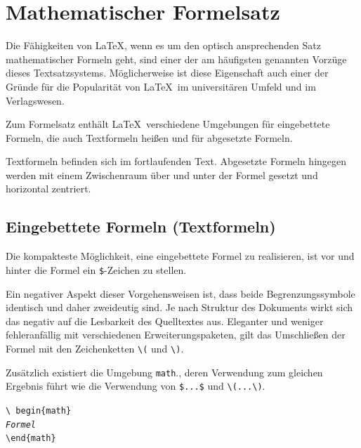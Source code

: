 \documentclass[a4paper,10pt,twoside]{scrbook}
\begin{document}
\chapter{Mathematischer Formelsatz}
\label{KapitelMathematik}

Die Fähigkeiten von \LaTeX, wenn es um den optisch ansprechenden Satz mathematischer Formeln geht, sind einer der am häufigsten genannten Vorzüge dieses Textsatzsystems. Möglicherweise ist diese Eigenschaft auch einer der Gründe für die Popularität von \LaTeX\ 
im universitären Umfeld und im Verlagswesen.


Zum Formelsatz enthält \LaTeX\ verschiedene Umgebungen für eingebettete Formeln, die auch Textformeln heißen
und für abgesetzte Formeln.

Textformeln befinden sich im fortlaufenden Text. Abgesetzte Formeln hingegen werden
mit einem Zwischenraum über und unter der Formel gesetzt und horizontal zentriert.

\section{Eingebettete Formeln (Textformeln)}

Die kompakteste Möglichkeit, eine eingebettete Formel zu realisieren, ist vor und hinter die 
Formel ein \verb!$!-Zeichen zu stellen. 


Ein negativer Aspekt dieser Vorgehensweisen ist, dass
beide Begrenzungssymbole identisch und daher zweideutig sind. 
Je nach Struktur des Dokuments wirkt sich das negativ auf die Lesbarkeit des Quelltextes aus.
Eleganter und weniger fehleranfällig mit verschiedenen Erweiterungspaketen, gilt das 
Umschließen der Formel mit den Zeichenketten \verb!\(! und \verb!\)!.



Zusätzlich existiert die Umgebung \verb!math!., deren Verwendung zum
gleichen Ergebnis führt wie die
Verwendung von \verb!$...$! und \verb!\(...\)!.

\begin{boxedminipage}{\textwidth}
\texttt{\textbackslash
begin\{math\} \\
\textsl{Formel} \\
\textbackslash end\{math\}}
\end{boxedminipage}
\end{document}
